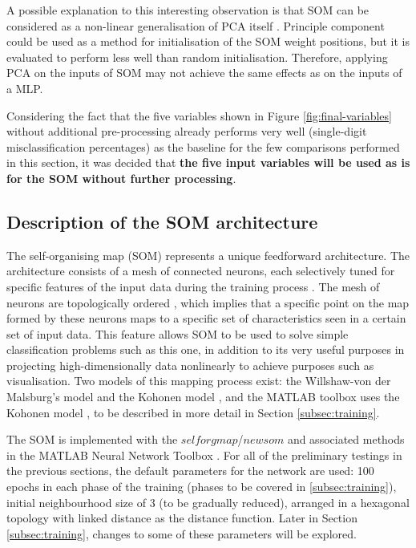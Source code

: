 \documentclass[10pt, oneside]{article}
\begin{document}
A possible explanation to this interesting observation is that SOM can be considered as a non-linear generalisation of PCA itself \cite[p. 1]{akinduko2012initialization}. Principle component could be used as a method for initialisation of the SOM weight positions, but it is evaluated to perform less well than random initialisation. Therefore, applying PCA on the inputs of SOM may not achieve the same effects as on the inputs of a MLP. 

Considering the fact that the five variables shown in Figure \ref{fig:final-variables} without additional pre-processing already performs very well (single-digit misclassification percentages) as the baseline for the few comparisons performed in this section, it was decided that \textbf{the five input variables will be used as is for the SOM without further processing}.

\subsection{Description of the SOM architecture}

The self-organising map (SOM) represents a unique feedforward architecture. The architecture consists of a mesh of connected neurons, each selectively tuned for specific features of the input data during the training process \cite[Sec. 9.1]{haykin2008}. The mesh of neurons are topologically ordered \cite[p. 11]{som-lecture}, which implies that a specific point on the map formed by these neurons maps to a specific set of characteristics seen in a certain set of input data. This feature allows SOM to be used to solve simple classification problems such as this one, in addition to its very useful purposes in projecting high-dimensionally data nonlinearly to achieve purposes such as visualisation. Two models of this mapping process exist: the Willshaw-von der Malsburg's model and the Kohonen model \cite[Sec. 9.2]{haykin2008}, and the MATLAB toolbox uses the Kohonen model \cite{som-matlab}, to be described in more detail in Section \ref{subsec:training}.

The SOM is implemented with the $selforgmap$/$newsom$ and associated methods in the MATLAB Neural Network Toolbox \cite{kohonen2014matlab}. For all of the preliminary testings in the previous sections, the default parameters for the network are used: 100 epochs in each phase of the training (phases to be covered in \ref{subsec:training}), initial neighbourhood size of 3 (to be gradually reduced), arranged in a hexagonal topology with linked distance as the distance function. Later in Section \ref{subsec:training}, changes to some of these parameters will be explored.
\end{document}
